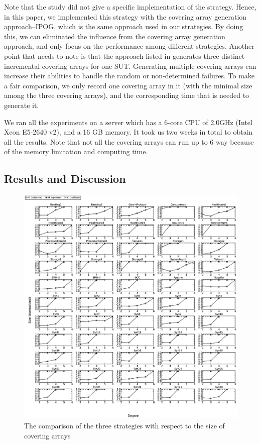 \documentclass[conference]{IEEEtran}
\theoremstyle{definition}
\begin{document}
Note that the study \cite{fouche2009incremental} did not give a specific implementation of the strategy. Hence, in this paper, we implemented this strategy with the covering array generation approach--IPOG, which is the same approach used in our strategies.  By doing this, we can eliminated the influence from the covering array generation approach, and only focus on the performance among different strategies. Another point that needs to note is that the approach listed in \cite{fouche2009incremental} generates three distinct incremental covering arrays for one SUT. Generating multiple covering arrays can increase their abilities to handle the random or non-determined failures. To make a fair comparison, we only record one covering array in it (with the minimal size among the three covering arrays), and the corresponding time that is needed to generate it.

We ran all the experiments on a server which has a 6-core CPU of 2.0GHz (Intel Xeon E5-2640 v2), and a 16 GB memory. It took us two weeks in total to obtain all the results. Note that not all the covering arrays can run up to 6 way because of the memory limitation and computing time.
\subsection{Results and Discussion}
\begin{figure}[htbp]
\center
 \includegraphics[width=7.4in]{size.eps}
\caption{The comparison of the three strategies with respect to the size of covering arrays}
\label{experiement}
\end{figure}
\end{document}
